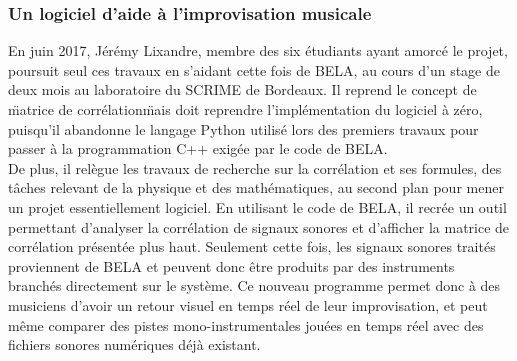 \documentclass{article}
\begin{document}
\subsubsection{Un logiciel d'aide à l'improvisation musicale}
En juin 2017, Jérémy Lixandre, membre des six étudiants ayant amorcé le projet, poursuit seul ces travaux en s'aidant cette fois de BELA, au cours d'un stage de deux mois au laboratoire du SCRIME de Bordeaux. Il reprend le concept de \"matrice de corrélation\" mais doit reprendre l'implémentation du logiciel à zéro, puisqu'il abandonne le langage Python utilisé lors des premiers travaux pour passer à la programmation C++ exigée par le code de BELA. \\
De plus, il relègue les travaux de recherche sur la corrélation et ses formules, des tâches relevant de la physique et des mathématiques, au second plan pour mener un projet essentiellement logiciel. En utilisant le code de BELA, il recrée un outil permettant d'analyser la corrélation de signaux sonores et d'afficher la matrice de corrélation présentée plus haut. Seulement cette fois, les signaux sonores traités proviennent de BELA et peuvent donc être produits par des instruments branchés directement sur le système. Ce nouveau programme permet donc à des musiciens d'avoir un retour visuel en temps réel de leur improvisation, et peut même comparer des pistes mono-instrumentales jouées en temps réel avec des fichiers sonores numériques déjà existant.
\end{document}
